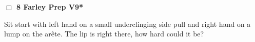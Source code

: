 \begin{multicols}{2}
\needspace{2em}
\label{rt:Farley Prep}
\colorbox{Goldenrod!20}{
\parbox{0.95\linewidth}{
\hspace{-1ex}\textbf{$\Box$
8 Farley Prep V9*  
}}}
\begin{adjustwidth}{1.3em}{}			

Sit start with left hand on a small underclinging side pull and right hand on a lump on the arête. The lip is right there, how hard could it be?
\end{adjustwidth}






\end{multicols}
\clearpage